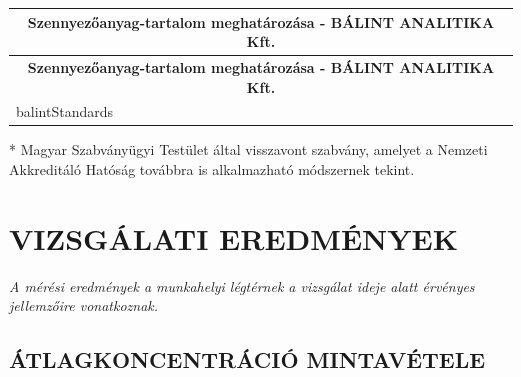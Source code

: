 \documentclass[a4paper,12pt]{article}
\begin{document}
		\begin{longtable}{|p{5cm}|p{10cm}|}
			\hline
			\multicolumn{2}{|c|}{\textbf{Szennyezőanyag-tartalom meghatározása - BÁLINT ANALITIKA Kft.}} \\
			\hline
			\endfirsthead

			\hline
			\multicolumn{2}{|c|}{\textbf{Szennyezőanyag-tartalom meghatározása - BÁLINT ANALITIKA Kft.}} \\
			\hline
			\endhead

			\endfoot

			\hline
			\endlastfoot

			{{balintStandards}}

		\end{longtable}


		\parbox{\textwidth}{\raggedright \footnotesize
			* Magyar Szabványügyi Testület által visszavont szabvány, amelyet a Nemzeti Akkreditáló Hatóság továbbra is alkalmazható módszernek tekint.
		}


	\newpage
	\section{VIZSGÁLATI EREDMÉNYEK}
		\begin{adjustwidth}{1cm}{0cm}
			\textit{A mérési eredmények a munkahelyi légtérnek a vizsgálat ideje alatt érvényes jellemzőire vonatkoznak.}
		\end{adjustwidth}

	\subsection{ÁTLAGKONCENTRÁCIÓ MINTAVÉTELE}
	
\end{document}
